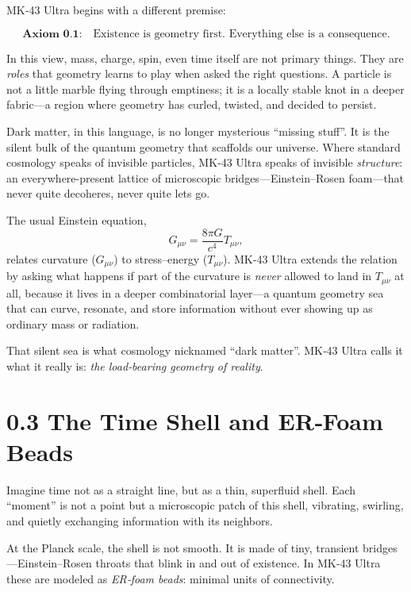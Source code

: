 MK‑43 Ultra begins with a different premise:

\begin{equation}
\textbf{Axiom 0.1:}\quad \text{Existence is geometry first. Everything else is a consequence.}
\end{equation}

In this view, mass, charge, spin, even time itself are not primary things. They are \emph{roles} that geometry learns to play when asked the right questions. A particle is not a little marble flying through emptiness; it is a locally stable knot in a deeper fabric---a region where geometry has curled, twisted, and decided to persist.

Dark matter, in this language, is no longer mysterious ``missing stuff''. It is the silent bulk of the quantum geometry that scaffolds our universe. Where standard cosmology speaks of invisible particles, MK‑43 Ultra speaks of invisible \emph{structure}: an everywhere-present lattice of microscopic bridges---Einstein–Rosen foam---that never quite decoheres, never quite lets go.

The usual Einstein equation,
\begin{equation}
G_{\mu\nu} = \frac{8\pi G}{c^4} T_{\mu\nu},
\end{equation}
relates curvature ($G_{\mu\nu}$) to stress–energy ($T_{\mu\nu}$). MK‑43 Ultra extends the relation by asking what happens if part of the curvature is \emph{never} allowed to land in $T_{\mu\nu}$ at all, because it lives in a deeper combinatorial layer---a quantum geometry sea that can curve, resonate, and store information without ever showing up as ordinary mass or radiation.

That silent sea is what cosmology nicknamed ``dark matter''. MK‑43 Ultra calls it what it really is: \emph{the load‑bearing geometry of reality}.

\section*{0.3 The Time Shell and ER‑Foam Beads}

Imagine time not as a straight line, but as a thin, superfluid shell. Each ``moment'' is not a point but a microscopic patch of this shell, vibrating, swirling, and quietly exchanging information with its neighbors.

At the Planck scale, the shell is not smooth. It is made of tiny, transient bridges---Einstein–Rosen throats that blink in and out of existence. In MK‑43 Ultra these are modeled as \emph{ER‑foam beads}: minimal units of connectivity.

